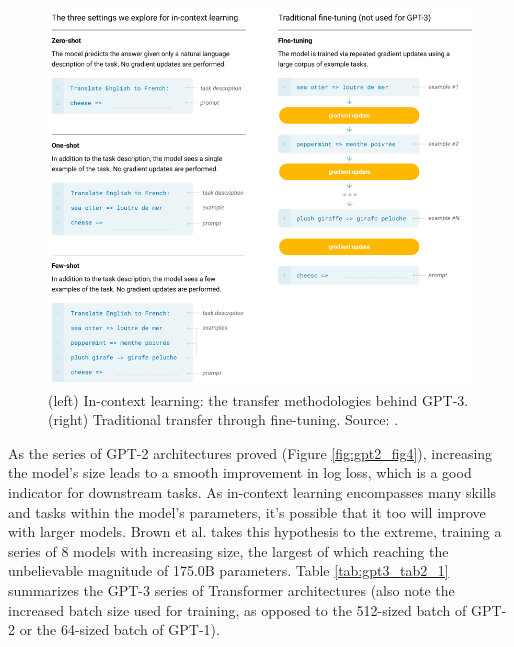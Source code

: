 \documentclass{article}
\begin{document}
\begin{figure}[ht!]
    \begin{center}
        \includegraphics[width=1.0\textwidth]{figures/gpt3_fig2_1.png}
    \end{center}
    \caption{
        (left) In-context learning: the transfer methodologies behind GPT-3. (right) Traditional transfer through fine-tuning. Source: \citet{brown2020gpt3}.
    }
    \label{fig:gpt3_fig2_1}
\end{figure}

\medskip
\noindent
As the series of GPT-2 architectures proved (Figure \ref{fig:gpt2_fig4}), increasing the model's size leads to a smooth improvement in log loss, which is a good indicator for downstream tasks. As in-context learning encompasses many skills and tasks within the model's parameters, it's possible that it too will improve with larger models. Brown et al. takes this hypothesis to the extreme, training a series of 8 models with increasing size, the largest of which reaching the unbelievable magnitude of 175.0B parameters. Table \ref{tab:gpt3_tab2_1} summarizes the GPT-3 series of Transformer architectures (also note the increased batch size used for training, as opposed to the 512-sized batch of GPT-2 or the 64-sized batch of GPT-1).
\end{document}
